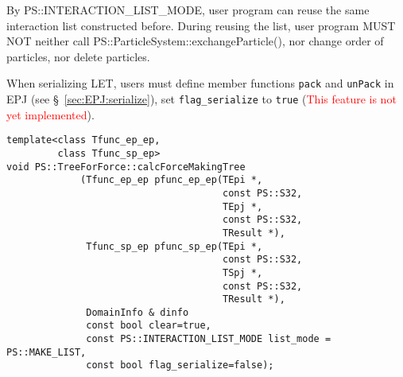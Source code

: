 \begin{itemize}
By PS::INTERACTION\_LIST\_MODE, user program can reuse the same interaction list constructed before. During reusing the list, user program MUST NOT neither call \newline PS::ParticleSystem::exchangeParticle(), nor change order of particles, nor delete particles.

When serializing LET, users must define member functions \texttt{pack} and \texttt{unPack} in EPJ (see \S~\ref{sec:EPJ:serialize}), set \texttt{flag\_serialize} to \texttt{true} (\textcolor{red}{This feature is not yet implemented}).

\end{itemize}

\begin{screen}
\begin{verbatim}
template<class Tfunc_ep_ep,
         class Tfunc_sp_ep>
void PS::TreeForForce::calcForceMakingTree
             (Tfunc_ep_ep pfunc_ep_ep(TEpi *,
                                      const PS::S32,
                                      TEpj *,
                                      const PS::S32,
                                      TResult *),
              Tfunc_sp_ep pfunc_sp_ep(TEpi *,
                                      const PS::S32,
                                      TSpj *,
                                      const PS::S32,
                                      TResult *),
              DomainInfo & dinfo
              const bool clear=true,
              const PS::INTERACTION_LIST_MODE list_mode = PS::MAKE_LIST,
              const bool flag_serialize=false);
\end{verbatim}
\end{screen}

